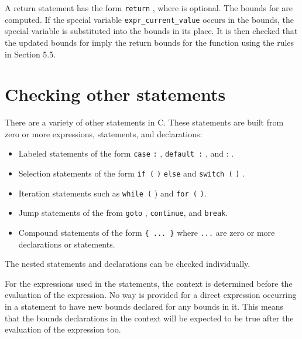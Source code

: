 A return statement has the form \texttt{return} , where 
is optional. The bounds for  are computed. If the special
variable \texttt{expr\_current\_value} occurs in the bounds, the special
variable  is substituted into the bounds in its
place. It is then checked that the updated bounds for  imply the
return bounds for the function using the rules in Section 5.5.

\section{Checking other statements}\label{checking-other-statements}

There are a variety of other statements in C. These statements are built
from zero or more expressions, statements, and declarations:

\begin{itemize}
\item
  Labeled statements of the form \texttt{case}
   \texttt{:} ,
  \texttt{default :} , and  :
  .
\item
  Selection statements of the form \texttt{if (}
  \texttt{)}  \texttt{else}
   and \texttt{switch (}  \texttt{)}
  .
\item
  Iteration statements such as \texttt{while (}  )
   and \texttt{for
  (}
  \texttt{)}.
\item
  Jump statements of the from \texttt{goto} ,
  \texttt{continue}, and \texttt{break}.
\item
  Compound statements of the form \texttt{\{ ... \}} where \texttt{...}
  are zero or more declarations or statements.
\end{itemize}

The nested statements and declarations can be checked individually.

For the expressions used in the statements, the context is determined
before the evaluation of the expression. No way is provided for a direct
expression occurring in a statement to have new bounds declared for any
bounds in it. This means that the bounds declarations in the context
will be expected to be true after the evaluation of the expression too.

